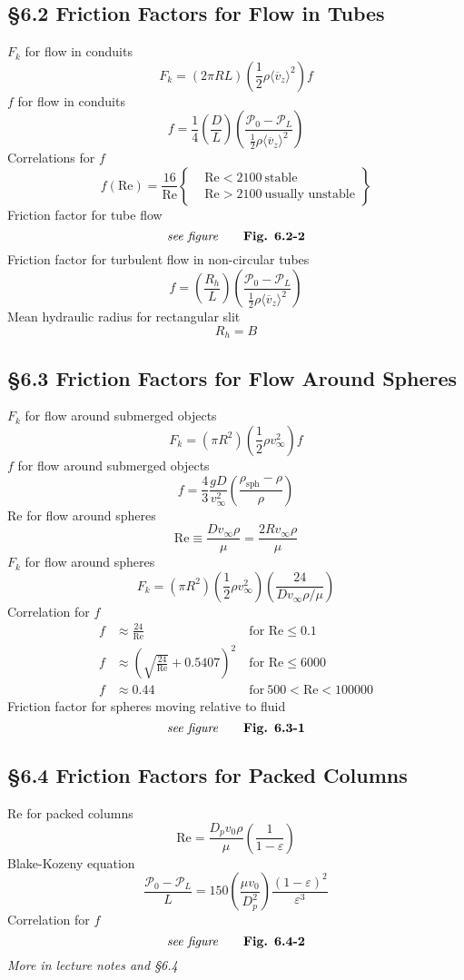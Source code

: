 \subsection{\S6.2 Friction Factors for Flow in Tubes}
$F_k$ for flow in conduits
\[
	F_k=(2\pi RL)\left(\frac{1}{2}\rho\langle\overline{v}_z\rangle^2\right)f\tag{6.1-2}
\]
$f$ for flow in conduits
\[
	f=\frac{1}{4}\left(\frac{D}{L}\right)\left(\frac{\mathscr{P}_0-\mathscr{P}_L}{\frac{1}{2}\rho\langle\overline{v}_z\rangle^2}\right)\tag{6.1-4}
\]
Correlations for $f$
\[
	f(\text{Re})=\frac{16}{\text{Re}}\left\{\begin{aligned}&\text{Re}<2100 \ \text{stable}\\&\text{Re}>2100 \ \text{usually unstable}\end{aligned}\right\}\tag{6.2-11}
\]
Friction factor for tube flow
\[
	\textit{see figure}\tag*{\textbf{Fig. 6.2-2}}
\]
Friction factor for turbulent flow in non-circular tubes
\[
	f=\left(\frac{R_h}{L}\right)\left(\frac{\mathscr{P}_0-\mathscr{P}_L}{\frac{1}{2}\rho\langle\overline{v}_z\rangle^2}\right)\tag{6.2-16}
\]
Mean hydraulic radius for rectangular slit
\[
	R_h=B\tag{Lecture notes 9.6}
\]
\subsection{\S6.3 Friction Factors for Flow Around Spheres}
$F_k$ for flow around submerged objects
\[
	F_k=(\pi R^2)\left(\frac{1}{2}\rho v_\infty^2\right)f\tag{6.1-5}
\]
$f$ for flow around submerged objects
\[
	f=\frac{4}{3}\frac{gD}{v_\infty^2}\left(\frac{\rho_\text{sph}-\rho}{\rho}\right)\tag{6.1-7}
\]
Re for flow around spheres
\[
	\text{Re}\equiv\frac{Dv_\infty\rho}{\mu}=\frac{2Rv_\infty\rho}{\mu}\tag{6.3-8}
\]
$F_k$ for flow around spheres
\[
	F_k=(\pi R^2)\left(\frac{1}{2}\rho v_\infty^2\right)\left(\frac{24}{Dv_\infty\rho/\mu}\right)\tag{6.3-14}
\]
Correlation for $f$
\begin{align}
	f&\approx\frac{24}{\text{Re}} \ &\text{for Re}\leq0.1\tag{6.3-15}\\
	f&\approx\left(\sqrt{\frac{24}{\text{Re}}}+0.5407\right)^2 \ &\text{for Re}\leq6000\tag{6.3-16}\\
	f&\approx0.44 \ &\text{for} \ 500<\text{Re}<100000\tag{6.3-17}
\end{align}
Friction factor for spheres moving relative to fluid
\[
	\textit{see figure}\tag*{\textbf{Fig. 6.3-1}}
\]
\subsection{\S6.4 Friction Factors for Packed Columns}
Re for packed columns
\[
	\text{Re}=\frac{D_pv_0\rho}{\mu}\left(\frac{1}{1-\varepsilon}\right)\tag{Lecture notes 9.20}
\]
Blake-Kozeny equation
\[
	\frac{\mathscr{P}_0-\mathscr{P}_L}{L}=150\left(\frac{\mu v_0}{D_p^2}\right)\frac{(1-\varepsilon)^2}{\varepsilon^3}\tag{6.4-9}
\]
Correlation for $f$
\[
	\textit{see figure}\tag*{\textbf{Fig. 6.4-2}}
\]
\textit{More in lecture notes and \S6.4}
